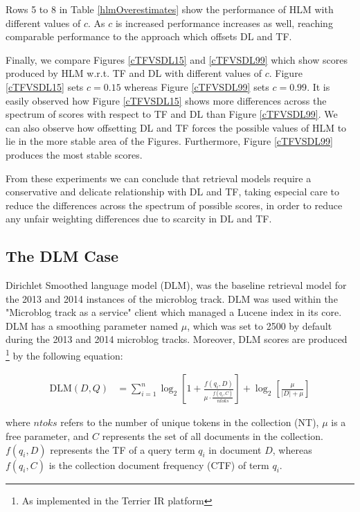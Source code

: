 Rows 5 to 8 in Table \ref{hlmOverestimates} show the performance of HLM with different values of $c$. As $c$ is increased performance increases as well, reaching comparable performance to the approach which offsets DL and TF.

Finally, we compare Figures \ref{cTFVSDL15} and \ref{cTFVSDL99} which show scores produced by HLM w.r.t. TF and DL with different values of $c$. Figure \ref{cTFVSDL15} sets $c=0.15$ whereas Figure \ref{cTFVSDL99} sets $c=0.99$. It is easily observed how Figure \ref{cTFVSDL15} shows more differences across the spectrum of scores with respect to TF and DL than Figure \ref{cTFVSDL99}. We can also observe how offsetting DL and TF forces the possible values of HLM to lie in the more stable area of the Figures. Furthermore, Figure \ref{cTFVSDL99} produces the most stable scores.

From these experiments we can conclude that retrieval models require a conservative and delicate relationship with DL and TF, taking especial care to reduce the differences across the spectrum of possible scores, in order to reduce any unfair weighting differences due to scarcity in DL and TF.

\subsection{The DLM Case}
Dirichlet Smoothed language model (DLM), was the baseline retrieval model for the 2013 and 2014 instances of the microblog track. DLM was used within the "Microblog track as a service" client which managed a Lucene index in its core. DLM has a smoothing parameter named $\mu$, which was set to 2500 by default during the 2013 and 2014 microblog tracks. Moreover, DLM scores are produced \footnote{As implemented in the Terrier IR platform} by the following equation:

\begin{small}
\begin{align}
\label{dlmformula}
    \text{DLM}(D,Q) &= \sum_{i=1}^{n} \log_2 \left[ 1 + \frac{f(q_i, D)}{\mu \cdot \frac{ f(q_i, C) }{ ntoks }}\right] + \log_2 \left[\frac{\mu}{|D| + \mu}\right]
\end{align}
\label{dlmequation}
\end{small}

\noindent where $ntoks$ refers to the number of unique tokens in the collection (NT), $\mu$ is a free parameter, and $C$ represents the set of all documents in the collection. $f(q_i, D)$ represents the TF of a query term $q_i$ in document $D$, whereas $f(q_i, C)$ is the collection document frequency (CTF) of term $q_i$.

